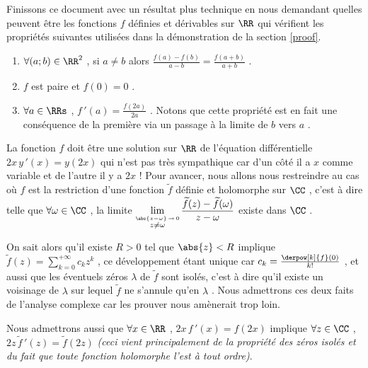 Finissons ce document avec un résultat plus technique en nous demandant quelles peuvent être les fonctions $f$ définies et dérivables sur $\RR$ qui vérifient les propriétés suivantes utilisées dans la démonstration de la section \ref{proof}.
\begin{enumerate}
	\item $\forall (a ; b) \in \RR^2$ , si $a \neq b$ alors $\frac{f(a) - f(b)}{a - b} = \frac{f(a + b)}{a + b}$ .

	\item $f$ est paire et $f(0) = 0$ .

	\item $\forall a \in \RRs$ , $f\,'(a) = \frac{f(2 a)}{2 a}$ . Notons que cette propriété est en fait une conséquence de la première via un passage à la limite de $b$ vers $a$ .
\end{enumerate}


\medskip


La fonction $f$ doit être une solution sur $\RR$ de l'équation différentielle $2 x \, y\,'(x) = y(2x)$ qui n'est pas très sympathique car d'un côté il a $x$ comme variable et de l'autre il y a $2x$ !
Pour avancer, nous allons nous restreindre au cas où $f$ est la restriction d'une fonction $\widetilde{f}$ définie et holomorphe sur $\CC$ , c'est à dire telle que $\forall \omega \in \CC$ , la limite $\displaystyle \lim_{\stackrel{\abs{z - \omega} \, \rightarrow \, 0}{z \neq \omega}} \frac{\widetilde{f}(z) - \widetilde{f}(\omega)}{z - \omega}$ existe dans $\CC$ .


On sait alors qu'il existe $R > 0$ tel que $\abs{z} < R$ implique
$\displaystyle \widetilde{f}(z) = \sum_{k = 0}^{+ \infty} c_k z^k$ , ce développement étant unique car $c_k = \frac{\derpow[k]{f}(0)}{k!}$ , et aussi que les éventuels zéros $\lambda$ de $\widetilde{f}$ sont isolés, c'est à dire qu'il existe un voisinage de $\lambda$ sur lequel $\widetilde{f}$ ne s'annule qu'en $\lambda$ . Nous admettrons ces deux faits de l'analyse complexe car les prouver nous amènerait trop loin.


\medskip

Nous admettrons aussi que $\forall x \in \RR$ , $2 x \, f\,'(x) = f(2x)$ implique $\forall z \in \CC$ , $2 z \, \widetilde{f}\,'(z) = \widetilde{f}(2z)$ \emph{(ceci vient principalement de la propriété des zéros isolés et du fait que toute fonction holomorphe l'est à tout ordre)}. 


\medskip

